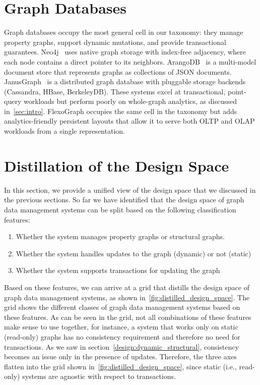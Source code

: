 \section{Graph Databases}
\label{design:graph_databases}
Graph databases occupy the most general cell in our taxonomy: they manage property graphs, support dynamic mutations, and provide transactional guarantees.
Neo4j~\cite{neo4j} uses native graph storage with index-free adjacency, where each node contains a direct pointer to its neighbors.
ArangoDB~\cite{arangodb} is a multi-model document store that represents graphs as collections of JSON documents.
JanusGraph~\cite{janusgraph} is a distributed graph database with pluggable storage backends (Cassandra, HBase, BerkeleyDB).
These systems excel at transactional, point-query workloads but perform poorly on whole-graph analytics, as discussed in~\autoref{sec:intro}.
FlexoGraph occupies the same cell in the taxonomy but adds analytics-friendly persistent layouts that allow it to serve both OLTP and OLAP workloads from a single representation.

\section{Distillation of the Design Space}
\label{design:distillation}
In this section, we provide a unified view of the design space that we discussed in the previous sections.
So far we have identified that the design space of graph data management systems can be split based on the following classification features:
\begin{enumerate}
  \item Whether the system manages property graphs or structural graphs.
  \item Whether the system handles updates to the graph (dynamic) or not (static)
  \item Whether the system supports transactions for updating the graph
\end{enumerate}

Based on these features, we can arrive at a grid that distills the design space of graph data management systems, as shown in~\autoref{fig:distilled_design_space}.
The grid shows the different classes of graph data management systems based on these features.
As can be seen in the grid, not all combinations of these features make sense to use together, for instance, a system that works only on static (read-only) graphs has no consistency requirement and therefore no need for transactions.
As we saw in section~\autoref{design:dynamic_structural}, consistency becomes an issue only in the presence of updates.
Therefore, the three axes flatten into the grid shown in~\autoref{fig:distilled_design_space}, since static (i.e., read-only) systems are agnostic with respect to transactions.

